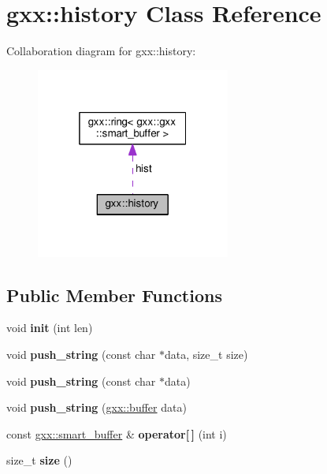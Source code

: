 \hypertarget{classgxx_1_1history}{}\section{gxx\+:\+:history Class Reference}
\label{classgxx_1_1history}


Collaboration diagram for gxx\+:\+:history\+:
\nopagebreak
\begin{figure}[H]
\begin{center}
\leavevmode
\includegraphics[width=181pt]{classgxx_1_1history__coll__graph}
\end{center}
\end{figure}
\subsection*{Public Member Functions}
\begin{DoxyCompactItemize}
\item 
void {\bfseries init} (int len)\hypertarget{classgxx_1_1history_a4982a43d254c97182b14dfedc9d61ca4}{}\label{classgxx_1_1history_a4982a43d254c97182b14dfedc9d61ca4}

\item 
void {\bfseries push\+\_\+string} (const char $\ast$data, size\+\_\+t size)\hypertarget{classgxx_1_1history_adbb9c466738dc966c61f2b4bc60d4517}{}\label{classgxx_1_1history_adbb9c466738dc966c61f2b4bc60d4517}

\item 
void {\bfseries push\+\_\+string} (const char $\ast$data)\hypertarget{classgxx_1_1history_ae101313c2b1d5635ae8c02478f8b0e64}{}\label{classgxx_1_1history_ae101313c2b1d5635ae8c02478f8b0e64}

\item 
void {\bfseries push\+\_\+string} (\hyperlink{classgxx_1_1buffer}{gxx\+::buffer} data)\hypertarget{classgxx_1_1history_a400ebe4d86e56a704d65289438812b37}{}\label{classgxx_1_1history_a400ebe4d86e56a704d65289438812b37}

\item 
const \hyperlink{classgxx_1_1smart__buffer}{gxx\+::smart\+\_\+buffer} \& {\bfseries operator\mbox{[}$\,$\mbox{]}} (int i)\hypertarget{classgxx_1_1history_ae3c65ffbe0fa47c99767e55dbecfb55f}{}\label{classgxx_1_1history_ae3c65ffbe0fa47c99767e55dbecfb55f}

\item 
size\+\_\+t {\bfseries size} ()\hypertarget{classgxx_1_1history_a8add213df7e01564383698a8adf86568}{}\label{classgxx_1_1history_a8add213df7e01564383698a8adf86568}

\end{DoxyCompactItemize}
